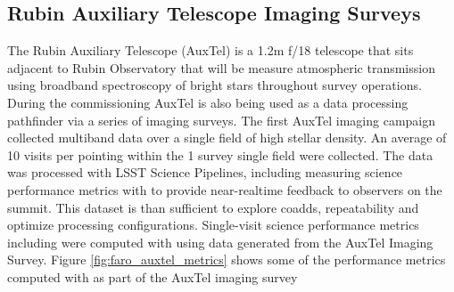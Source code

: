 \subsection{Rubin Auxiliary Telescope Imaging Surveys} \label{ssec:auxtel}

The Rubin Auxiliary Telescope\cite{10.1117/12.2561112} (AuxTel) is a 1.2m f/18 telescope that sits adjacent to Rubin Observatory that will be measure atmospheric transmission using broadband spectroscopy of bright stars throughout survey operations. 
During the commissioning AuxTel is also being used as a data processing pathfinder via a series of imaging surveys.
The first AuxTel imaging campaign collected multiband data over a single field of high stellar density.
An average of 10 visits per pointing within the 1 \degsq survey single field were collected. 
The data was processed with LSST Science Pipelines, including measuring science performance metrics with \faro to provide near-realtime feedback to observers on the summit.
This dataset is than sufficient to explore coadds, repeatability and optimize processing configurations.
Single-visit science performance metrics including  were computed with \faro using data generated from the AuxTel Imaging Survey. 
Figure \ref{fig:faro_auxtel_metrics} shows some of the performance metrics computed with \faro as part of the AuxTel imaging survey

